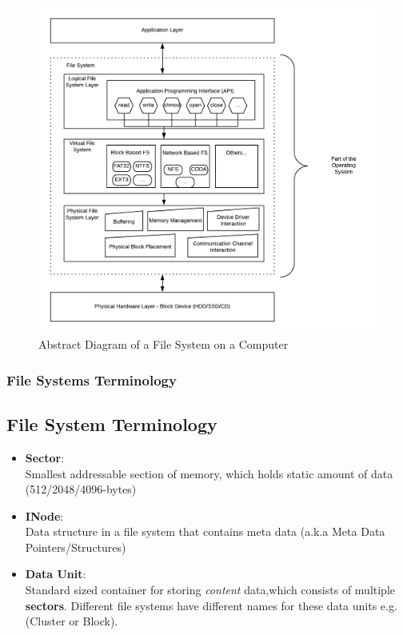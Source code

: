 \documentclass{beamer}
\begin{document}
\begin{frame}[allowframebreaks]
	\begin{figure}[h]
		\includegraphics[scale=0.5]{abstract-fs-diagram}
		\caption{Abstract Diagram of a File System on a Computer}
		\label{fig:abstract-fs-diagram}	
	\end{figure}
	
\end{frame}

\begin{frame}
	\frametitle{File Systems Terminology}
	\subsection*{File System Terminology}
	\begin{itemize}
		\item{\textbf{Sector}}:\\ Smallest addressable section of memory, which holds static amount of data (512/2048/4096-bytes)
		\item\textbf{INode}:\\ Data structure in a file system that contains meta data (a.k.a Meta Data Pointers/Structures)
		\item\textbf{Data Unit}:\\ Standard sized container for storing \textit{content} data,which consists of multiple \textbf{sectors}. Different file systems have different names for these data units e.g. (Cluster or Block). 
	\end{itemize}
\end{frame}
\end{document}
